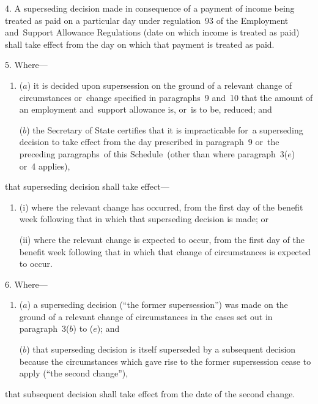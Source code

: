 \documentclass[12pt,a4paper]{article}
\begin{document}
\medskip

4.  A superseding decision made in consequence of a payment of income being treated as paid on a particular day under regulation~93 of the Employment and~Support Allowance Regulations (date on which income is treated as paid) shall take effect from the day on which that payment is treated as paid.

\medskip

5.  Where—
\begin{enumerate}\item[]
($a$) it is decided upon supersession on the ground of a relevant change of circumstances or~change specified in paragraphs~9 and~10 that the amount of an employment and~support allowance is, or~is to be, reduced; and

($b$) the Secretary of State certifies that it is impracticable for~a superseding decision to take effect from the day prescribed in paragraph~9 or~the preceding paragraphs~of this Schedule~(other than where paragraph~3($e$)  or~4 applies),
\end{enumerate}
that superseding decision shall take effect—
\begin{enumerate}\item[]
(i) where the relevant change has occurred, from the first day of the benefit week following that in which that superseding decision is made; or

(ii) where the relevant change is expected to occur, from the first day of the benefit week following that in which that change of circumstances is expected to occur.
\end{enumerate}

\medskip

6.  Where—
\begin{enumerate}\item[]
($a$) a superseding decision (“the former supersession”) was made on the ground of a relevant change of circumstances in the cases set out in paragraph~3($b$)  to ($e$); and

($b$) that superseding decision is itself superseded by a subsequent decision because the circumstances which gave rise to the former supersession cease to apply (“the second change”),
\end{enumerate}
that subsequent decision shall take effect from the date of the second change.

\medskip
\end{document}
